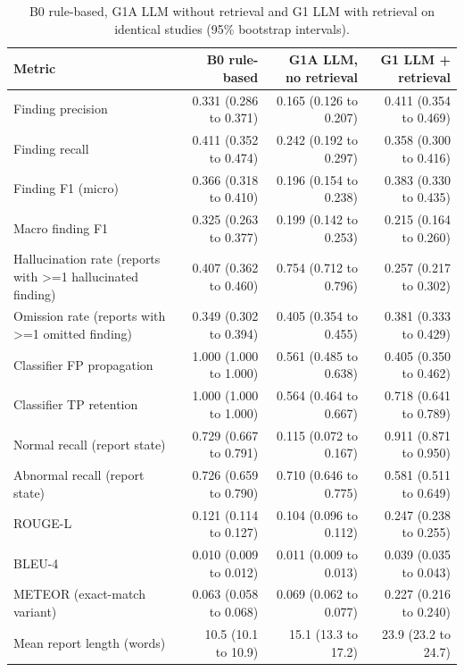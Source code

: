\begin{table}[t]
\centering
\scriptsize
\begin{tabular}{lrrr}
\hline
Metric & B0 rule-based & G1A LLM, no retrieval & G1 LLM + retrieval \\
\hline
Finding precision & 0.331 (0.286 to 0.371) & 0.165 (0.126 to 0.207) & 0.411 (0.354 to 0.469) \\
Finding recall & 0.411 (0.352 to 0.474) & 0.242 (0.192 to 0.297) & 0.358 (0.300 to 0.416) \\
Finding F1 (micro) & 0.366 (0.318 to 0.410) & 0.196 (0.154 to 0.238) & 0.383 (0.330 to 0.435) \\
Macro finding F1 & 0.325 (0.263 to 0.377) & 0.199 (0.142 to 0.253) & 0.215 (0.164 to 0.260) \\
Hallucination rate (reports with >=1 hallucinated finding) & 0.407 (0.362 to 0.460) & 0.754 (0.712 to 0.796) & 0.257 (0.217 to 0.302) \\
Omission rate (reports with >=1 omitted finding) & 0.349 (0.302 to 0.394) & 0.405 (0.354 to 0.455) & 0.381 (0.333 to 0.429) \\
Classifier FP propagation & 1.000 (1.000 to 1.000) & 0.561 (0.485 to 0.638) & 0.405 (0.350 to 0.462) \\
Classifier TP retention & 1.000 (1.000 to 1.000) & 0.564 (0.464 to 0.667) & 0.718 (0.641 to 0.789) \\
Normal recall (report state) & 0.729 (0.667 to 0.791) & 0.115 (0.072 to 0.167) & 0.911 (0.871 to 0.950) \\
Abnormal recall (report state) & 0.726 (0.659 to 0.790) & 0.710 (0.646 to 0.775) & 0.581 (0.511 to 0.649) \\
ROUGE-L & 0.121 (0.114 to 0.127) & 0.104 (0.096 to 0.112) & 0.247 (0.238 to 0.255) \\
BLEU-4 & 0.010 (0.009 to 0.012) & 0.011 (0.009 to 0.013) & 0.039 (0.035 to 0.043) \\
METEOR (exact-match variant) & 0.063 (0.058 to 0.068) & 0.069 (0.062 to 0.077) & 0.227 (0.216 to 0.240) \\
Mean report length (words) & 10.5 (10.1 to 10.9) & 15.1 (13.3 to 17.2) & 23.9 (23.2 to 24.7) \\
\hline
\end{tabular}
\caption{B0 rule-based, G1A LLM without retrieval and G1 LLM with retrieval on identical studies (95\% bootstrap intervals).}
\label{tab:table1_three_system_main_comparison}
\end{table}
